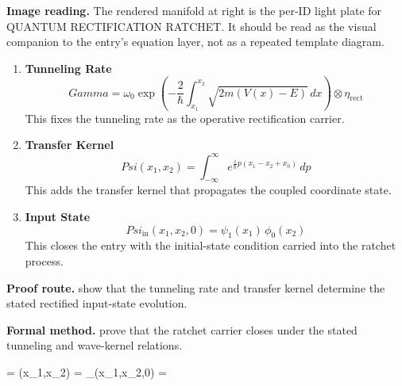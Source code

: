\begin{samepage}
\noindent\begin{minipage}[t]{0.45\linewidth}
\vspace{0pt}
\raggedright
\scriptsize\textbf{Image reading.} The rendered manifold at right is the per-ID light plate for QUANTUM RECTIFICATION RATCHET. It should be read as the visual companion to the entry's equation layer, not as a repeated template diagram.\par
\end{minipage}\hfill
\begin{minipage}[t]{0.53\linewidth}
\vspace*{-0.10in}
\raggedright
{}
\end{minipage}
\end{samepage}

\clearpage


\begin{enumerate}[leftmargin=1.6em,itemsep=9pt,topsep=6pt]
\item \textbf{Tunneling Rate}
\[
Gamma=\omega_{0}\exp\!\left(-\frac{2}{\hbar}\int_{x_{1}}^{x_{2}}\sqrt{2m(V(x)-E)}\,dx\right)\otimes \eta_{\mathrm{rect}}
\]
This fixes the tunneling rate as the operative rectification carrier.

\item \textbf{Transfer Kernel}
\[
Psi(x_{1},x_{2})=\int_{-\infty}^{\infty}e^{\tfrac{i}{\hbar}p(x_{1}-x_{2}+x_{0})}\,dp
\]
This adds the transfer kernel that propagates the coupled coordinate state.

\item \textbf{Input State}
\[
Psi_{\mathrm{in}}(x_{1},x_{2},0)=\psi_{1}(x_{1})\,\phi_{0}(x_{2})
\]
This closes the entry with the initial-state condition carried into the ratchet process.
\end{enumerate}

\textbf{Proof route.} show that the tunneling rate and transfer kernel determine the stated rectified input-state evolution.

\textbf{Formal method.} prove that the ratchet carrier closes under the stated tunneling and wave-kernel relations.

\medskip
{}

\begin{tzpsnapshot}
\end{tzpsnapshot}

\tzpequationlinks
  { = \cdots}
  {(x_{1},x_{2}) = \cdots}
  {_{}(x_{1},x_{2},0) = \cdots}
